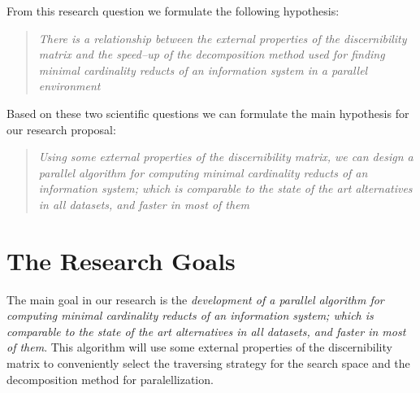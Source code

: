 \documentclass[11pt]{article}   %
\begin{document}
  From this research question we formulate the following hypothesis:
    
\begin{quote}
  \emph{There is a relationship between the external properties of the discernibility matrix and the 
  		speed--up of the decomposition method used for finding minimal cardinality reducts of an information
  		system in a parallel environment}
\end{quote}

  Based on these two scientific questions we can formulate the main hypothesis for our research proposal:
  
\begin{quote}
  \emph{Using some external properties of the discernibility matrix, we can design a parallel algorithm 
  		for computing minimal cardinality reducts of an information system; which is comparable to the 
  		state of the art alternatives in all datasets, and faster in most of them}
\end{quote}  

\section{The Research Goals}\label{Goals} 
  The main goal in our research is the \emph{development of  a parallel algorithm for computing minimal
  cardinality reducts of an information system; which is comparable to the state of the art alternatives 
  in all datasets, and faster in most of them}. This algorithm will use some external properties of the
  discernibility matrix to conveniently select the traversing strategy for the search space and the 
  decomposition method for paralellization.
  
\end{document}
